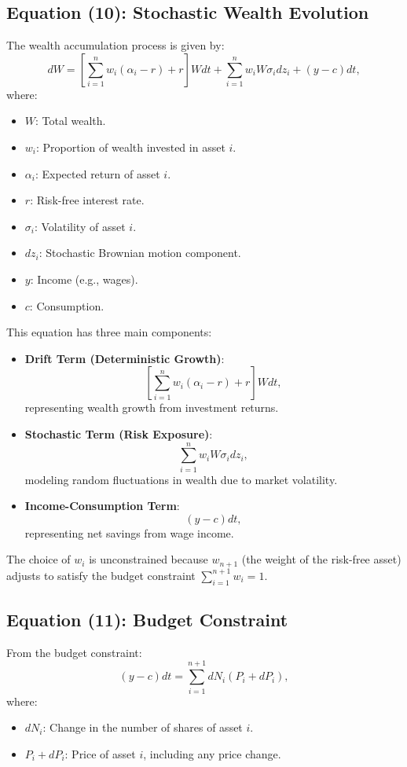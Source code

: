 \documentclass{article}
\begin{document}
\subsection*{Equation (10): Stochastic Wealth Evolution}
The wealth accumulation process is given by:
\[
dW = \left[ \sum_{i=1}^{n} w_i (\alpha_i - r) + r \right] W dt + \sum_{i=1}^{n} w_i W \sigma_i dz_i + (y - c) dt,
\]
where:
\begin{itemize}
    \item \( W \): Total wealth.
    \item \( w_i \): Proportion of wealth invested in asset \( i \).
    \item \( \alpha_i \): Expected return of asset \( i \).
    \item \( r \): Risk-free interest rate.
    \item \( \sigma_i \): Volatility of asset \( i \).
    \item \( dz_i \): Stochastic Brownian motion component.
    \item \( y \): Income (e.g., wages).
    \item \( c \): Consumption.
\end{itemize}

This equation has three main components:
\begin{itemize}
    \item \textbf{Drift Term (Deterministic Growth)}:
    \[
    \left[ \sum_{i=1}^{n} w_i (\alpha_i - r) + r \right] W dt,
    \]
    representing wealth growth from investment returns.
    
    \item \textbf{Stochastic Term (Risk Exposure)}:
    \[
    \sum_{i=1}^{n} w_i W \sigma_i dz_i,
    \]
    modeling random fluctuations in wealth due to market volatility.
    
    \item \textbf{Income-Consumption Term}:
    \[
    (y - c) dt,
    \]
    representing net savings from wage income.
\end{itemize}

The choice of \( w_i \) is unconstrained because \( w_{n+1} \) (the weight of the risk-free asset) adjusts to satisfy the budget constraint \( \sum_{i=1}^{n+1} w_i = 1 \).

\subsection*{Equation (11): Budget Constraint}
From the budget constraint:
\[
(y - c) dt = \sum_{i=1}^{n+1} dN_i (P_i + dP_i),
\]
where:
\begin{itemize}
    \item \( dN_i \): Change in the number of shares of asset \( i \).
    \item \( P_i + dP_i \): Price of asset \( i \), including any price change.
\end{itemize}
\end{document}
